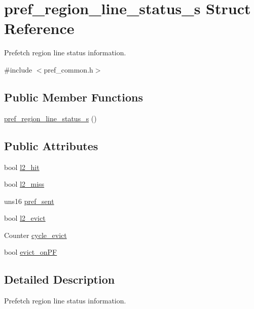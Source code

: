 \hypertarget{structpref__region__line__status__s}{
\section{pref\_\-region\_\-line\_\-status\_\-s Struct Reference}
\label{structpref__region__line__status__s}
}


Prefetch region line status information.  




{\ttfamily \#include $<$pref\_\-common.h$>$}

\subsection*{Public Member Functions}
\begin{DoxyCompactItemize}
\item 
\hyperlink{structpref__region__line__status__s_ae0ed1111dee24577d3510f11fdfe5493}{pref\_\-region\_\-line\_\-status\_\-s} ()
\end{DoxyCompactItemize}
\subsection*{Public Attributes}
\begin{DoxyCompactItemize}
\item 
bool \hyperlink{structpref__region__line__status__s_a3a792d0fa5a569885b3140dc6e7bb4cf}{l2\_\-hit}
\item 
bool \hyperlink{structpref__region__line__status__s_a966e10800fabfe683412b2ad249d2308}{l2\_\-miss}
\item 
uns16 \hyperlink{structpref__region__line__status__s_acc76237bba89f651fb6b24ae943be2bd}{pref\_\-sent}
\item 
bool \hyperlink{structpref__region__line__status__s_ae765928b442bb6d0bad36a21bdecb7fb}{l2\_\-evict}
\item 
Counter \hyperlink{structpref__region__line__status__s_aaf238eaba3fec92c5e4a1a4e6e25c1e7}{cycle\_\-evict}
\item 
bool \hyperlink{structpref__region__line__status__s_ac2e89200cbe091e9f64362565759c169}{evict\_\-onPF}
\end{DoxyCompactItemize}


\subsection{Detailed Description}
Prefetch region line status information. 

